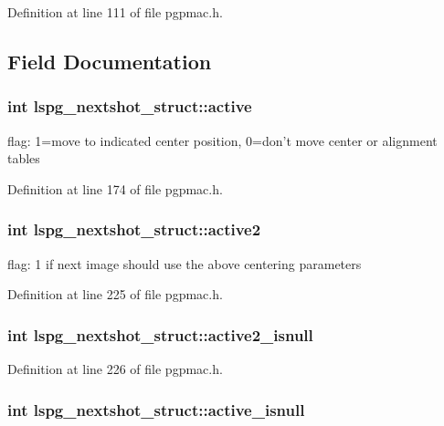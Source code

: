 Definition at line 111 of file pgpmac.h.

\subsection{Field Documentation}
\hypertarget{structlspg__nextshot__struct_a1a94eefbad713976a3d9213695a6ca28}{
\subsubsection[{active}]{\setlength{\rightskip}{0pt plus 5cm}int {\bf lspg\_\-nextshot\_\-struct::active}}}
\label{structlspg__nextshot__struct_a1a94eefbad713976a3d9213695a6ca28}


flag: 1=move to indicated center position, 0=don't move center or alignment tables 

Definition at line 174 of file pgpmac.h.\hypertarget{structlspg__nextshot__struct_a2875aa18df587806a3d8c05220fd62b5}{
\subsubsection[{active2}]{\setlength{\rightskip}{0pt plus 5cm}int {\bf lspg\_\-nextshot\_\-struct::active2}}}
\label{structlspg__nextshot__struct_a2875aa18df587806a3d8c05220fd62b5}


flag: 1 if next image should use the above centering parameters 

Definition at line 225 of file pgpmac.h.\hypertarget{structlspg__nextshot__struct_a1aa11ff4a4c8d69695786b4349e84e6b}{
\subsubsection[{active2\_\-isnull}]{\setlength{\rightskip}{0pt plus 5cm}int {\bf lspg\_\-nextshot\_\-struct::active2\_\-isnull}}}
\label{structlspg__nextshot__struct_a1aa11ff4a4c8d69695786b4349e84e6b}


Definition at line 226 of file pgpmac.h.\hypertarget{structlspg__nextshot__struct_a9f777671ec617a0f533b3c51f28babb3}{
\subsubsection[{active\_\-isnull}]{\setlength{\rightskip}{0pt plus 5cm}int {\bf lspg\_\-nextshot\_\-struct::active\_\-isnull}}}
\label{structlspg__nextshot__struct_a9f777671ec617a0f533b3c51f28babb3}



